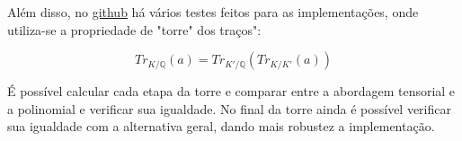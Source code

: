 Além disso, no \href{https://github.com/gustavoesteche/ic-bootstraping}{github} há vários testes feitos para as implementações, onde utiliza-se a propriedade de "torre" dos traços":

\begin{equation}
    Tr_{K/\mathbb{Q}} (a) = Tr_{K'/\mathbb{Q}}(Tr_{K/K'} (a))
\end{equation}

É possível calcular cada etapa da torre e comparar entre a abordagem tensorial e a polinomial e verificar sua igualdade. No final da torre ainda é possível
verificar sua igualdade com a alternativa geral, dando mais robustez a implementação.